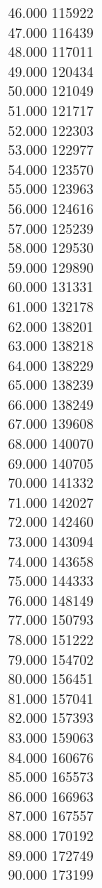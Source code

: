 { 46.000	115922 \\
 47.000	116439 \\
 48.000	117011 \\
 49.000	120434 \\
 50.000	121049 \\
 51.000	121717 \\
 52.000	122303 \\
 53.000	122977 \\
 54.000	123570 \\
 55.000	123963 \\
 56.000	124616 \\
 57.000	125239 \\
 58.000	129530 \\
 59.000	129890 \\
 60.000	131331 \\
 61.000	132178 \\
 62.000	138201 \\
 63.000	138218 \\
 64.000	138229 \\
 65.000	138239 \\
 66.000	138249 \\
 67.000	139608 \\
 68.000	140070 \\
 69.000	140705 \\
 70.000	141332 \\
 71.000	142027 \\
 72.000	142460 \\
 73.000	143094 \\
 74.000	143658 \\
 75.000	144333 \\
 76.000	148149 \\
 77.000	150793 \\
 78.000	151222 \\
 79.000	154702 \\
 80.000	156451 \\
 81.000	157041 \\
 82.000	157393 \\
 83.000	159063 \\
 84.000	160676 \\
 85.000	165573 \\
 86.000	166963 \\
 87.000	167557 \\
 88.000	170192 \\
 89.000	172749 \\
 90.000	173199 \\
}
